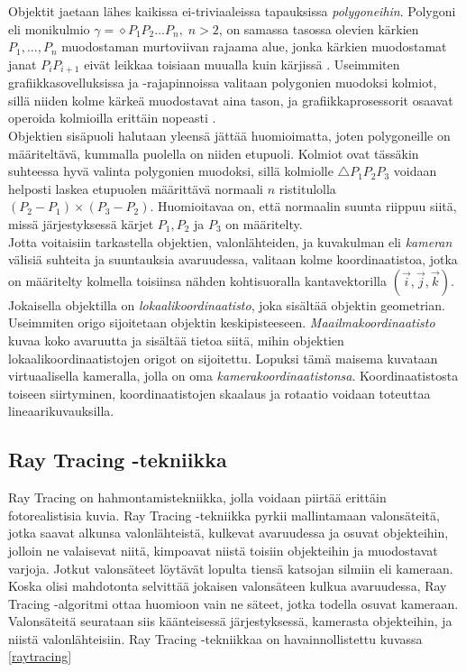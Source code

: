 ﻿\documentclass[a4paper,12pt, titlepage]{article}
\begin{document}
Objektit jaetaan lähes kaikissa ei-triviaaleissa tapauksissa \emph{polygoneihin}. Polygoni eli monikulmio $\gamma = \diamond P_1P_2...P_n, \; n > 2$, on samassa tasossa olevien kärkien $P_1,...,P_n$ muodostaman murtoviivan rajaama alue, jonka kärkien muodostamat janat $P_i P_{i+1}$ eivät leikkaa toisiaan muualla kuin kärjissä \citep{harju}. Useimmiten grafiikkasovelluksissa ja -rajapinnoissa valitaan polygonien muodoksi kolmiot, sillä niiden kolme kärkeä muodostavat aina tason, ja grafiikkaprosessorit osaavat operoida kolmioilla erittäin nopeasti \citep{angel}.\\

Objektien sisäpuoli halutaan yleensä jättää huomioimatta, joten polygoneille on määriteltävä, kummalla puolella on niiden etupuoli. Kolmiot ovat tässäkin suhteessa hyvä valinta polygonien muodoksi, sillä kolmiolle $\triangle P_1P_2P_3$ voidaan helposti laskea etupuolen määrittävä normaali $n$ ristitulolla $(P_2-P_1) \times (P_3-P_2)$. Huomioitavaa on, että normaalin suunta riippuu siitä, missä järjestyksessä kärjet $P_1, P_2$ ja $P_3$ on määritelty. \citep[.]{hughes}\\

Jotta voitaisiin tarkastella objektien, valonlähteiden, ja kuvakulman eli \emph{kameran} välisiä suhteita ja suuntauksia avaruudessa, valitaan kolme koordinaatistoa, jotka on määritelty kolmella toisiinsa nähden kohtisuoralla kantavektorilla $(\vec{i},\vec{j},\vec{k})$. Jokaisella objektilla on \emph{lokaalikoordinaatisto}, joka sisältää objektin geometrian. Useimmiten origo sijoitetaan objektin keskipisteeseen. \emph{Maailmakoordinaatisto} kuvaa koko avaruutta ja sisältää tietoa siitä, mihin objektien lokaalikoordinaatistojen origot on sijoitettu. Lopuksi tämä maisema kuvataan virtuaalisella kameralla, jolla on oma \emph{kamerakoordinaatistonsa}. Koordinaatistosta toiseen siirtyminen, koordinaatistojen skaalaus ja rotaatio voidaan toteuttaa lineaarikuvauksilla. \citep[.]{janke}

\subsection{Ray Tracing -tekniikka}

Ray Tracing on hahmontamistekniikka, jolla voidaan piirtää erittäin fotorealistisia kuvia. Ray Tracing -tekniikka pyrkii mallintamaan valonsäteitä, jotka saavat alkunsa valonlähteistä, kulkevat avaruudessa ja osuvat objekteihin, jolloin ne valaisevat niitä, kimpoavat niistä toisiin objekteihin ja muodostavat varjoja. Jotkut valonsäteet löytävät lopulta tiensä katsojan silmiin eli kameraan. Koska olisi mahdotonta selvittää jokaisen valonsäteen kulkua avaruudessa, Ray Tracing -algoritmi ottaa huomioon vain ne säteet, jotka todella osuvat kameraan. Valonsäteitä seurataan siis käänteisessä järjestyksessä, kamerasta objekteihin, ja niistä valonlähteisiin. Ray Tracing -tekniikkaa on havainnollistettu kuvassa \ref{raytracing} \citep[.]{janke}\\
\end{document}
